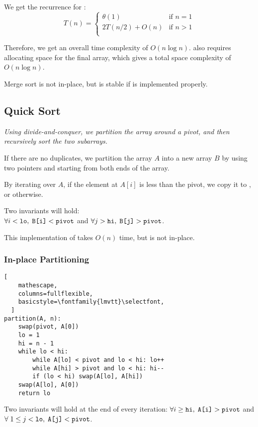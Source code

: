 We get the recurrence for : \\[0.2em]
\[ T(n) = \begin{cases} 
    \theta(1) & \text{if } n = 1 \\
    2T(n/2) + O(n) & \text{if $n > 1$} \\
 \end{cases}
\]

Therefore, we get an overall time complexity of $O(n \log n)$.
 also requires allocating space for the final array, which gives a total space complexity of $O(n \log n)$.

Merge sort is not in-place, but is stable if  is implemented properly.

\subsection{Quick Sort}
\emph{Using divide-and-conquer, we partition the array around a pivot, and then recursively sort the two subarrays.}

If there are no duplicates, we partition the array $A$ into a new array $B$ by using two pointers  and 
starting from both ends of the array.

By iterating over $A$, if the element at $A[i]$ is less than the pivot, we copy it to , or  otherwise.

Two invariants will hold:\\
$\forall i < \texttt{lo}, \; \texttt{B[i]} < \texttt{pivot}$ and $\forall j > \texttt{hi}, \; \texttt{B[j]} > \texttt{pivot}$.

This implementation of  takes $O(n)$ time, but is not in-place.

\subsubsection{In-place Partitioning}
\begin{lstlisting}[
    mathescape,
    columns=fullflexible,
    basicstyle=\fontfamily{lmvtt}\selectfont,
  ]
partition(A, n):
    swap(pivot, A[0])
    lo = 1
    hi = n - 1
    while lo < hi:
        while A[lo] < pivot and lo < hi: lo++
        while A[hi] > pivot and lo < hi: hi--
        if (lo < hi) swap(A[lo], A[hi])
    swap(A[lo], A[0])
    return lo
\end{lstlisting}

Two invariants will hold at the end of every iteration:\linebreak
 $\forall i \geq \texttt{hi}, \; \texttt{A[i]} > \texttt{pivot}$ and $\forall \; 1 \leq j < \texttt{lo}, \; \texttt{A[j]} < \texttt{pivot}$.

